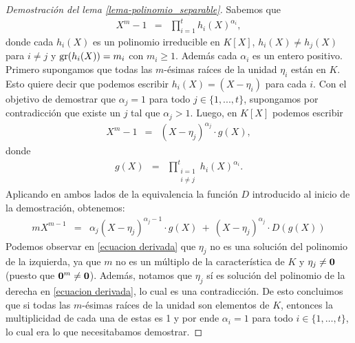 \begin{proof}[Demostración del lema \ref{lema-polinomio_separable}]
Sabemos que 
\begin{eqnarray*}
		X^m-1 & = & \prod_{i=1}^{t}h_i(X)^{\alpha_i}, 
		\end{eqnarray*}
donde cada $h_i(X)$ es un polinomio irreducible en $K[X]$, $h_i(X)\neq h_j(X)$ para $i\neq j$ y ${\rm gr}(h_i(X))=m_i$ con $m_i \geq 1$. Además cada $\alpha_i$ es un entero positivo.
Primero supongamos que todas las $m$-ésimas raíces de la unidad
$\eta_i$ están en $K$. Esto quiere decir que podemos escribir
$h_i(X)=(X-\eta_i)$ para cada $i$. Con el objetivo de demostrar que
$\alpha_j = 1$ para todo $j\in\{1,...,t\}$, supongamos por
contradicción que existe un $j$ tal que $\alpha_j>1$. Luego, en $K[X]$
podemos escribir
		\begin{eqnarray*}
			 X^{m}-1  &=& (X-\eta_j)^{\alpha_j}\cdot g(X),
	\end{eqnarray*}
	        donde
                \begin{eqnarray*}
			 g(X) &=& \prod_{\substack{i=1\\ i\neq j}}^{t}h_i(X)^{\alpha_i}.
	\end{eqnarray*}
                Aplicando en ambos lados de la equivalencia la función $D$ introducido al inicio de la demostración, obtenemos:
	\begin{eqnarray}
		m X^{m-1} & = & \alpha_j (X-\eta_j)^{\alpha_j -1}\cdot g(X)\ + \ (X-\eta_j)^{\alpha_j}\cdot D(g(X))\label{ecuacion derivada} 
		\end{eqnarray}
	Podemos observar en \eqref{ecuacion derivada} que $\eta_j$ no es una solución del polinomio de la izquierda, ya que $m$ no es un múltiplo de la característica de $K$
        y $\eta_j\neq \mathbf{0}$ (puesto que $\mathbf{0}^m\neq \mathbf{0}$). Además, notamos que $\eta_j$ sí es solución del polinomio de la derecha en \eqref{ecuacion derivada}, lo cual es una contradicción.   
	De esto concluimos que si todas las $m$-ésimas raíces de la unidad son elementos de $K$, entonces la multiplicidad de cada una de estas es 1 y por ende $\alpha_i = 1$ para todo $i \in \{1, \ldots, t\}$, lo cual era lo que necesitabamos demostrar.
        

\end{proof}
